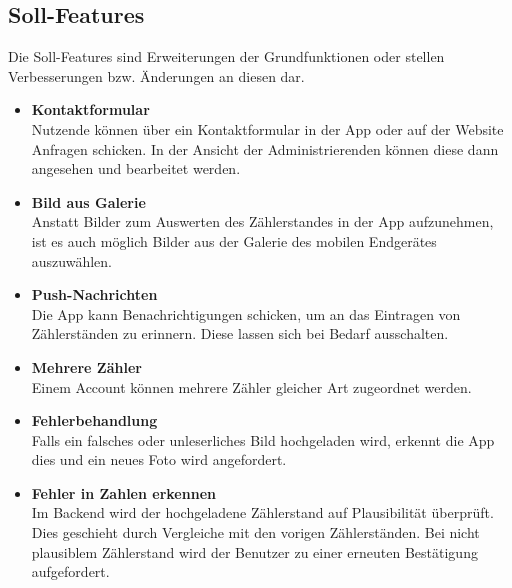 \subsection{Soll-Features}
Die Soll-Features sind Erweiterungen der Grundfunktionen oder stellen Verbesserungen bzw. Änderungen an diesen dar.
\begin{itemize}
\item \textbf{Kontaktformular} \hfill \\
	Nutzende können über ein Kontaktformular in der App oder auf der Website Anfragen schicken.
	In der Ansicht der Administrierenden können diese dann angesehen und bearbeitet werden. 
\item \textbf{Bild aus Galerie} \hfill \\
	Anstatt Bilder zum Auswerten des Zählerstandes in der App aufzunehmen, ist es auch möglich Bilder aus der Galerie des mobilen Endgerätes auszuwählen.
\item \textbf{Push-Nachrichten} \hfill \\
	Die App kann Benachrichtigungen schicken, um an das Eintragen von Zählerständen zu erinnern.
	Diese lassen sich bei Bedarf ausschalten.
\item \textbf{Mehrere Zähler}\hfill \\
	Einem Account können mehrere Zähler gleicher Art zugeordnet werden.
\item \textbf{Fehlerbehandlung} \hfill \\
	Falls ein falsches oder unleserliches Bild hochgeladen wird, erkennt die App dies und ein neues Foto wird angefordert.
\item \textbf{Fehler in Zahlen erkennen} \hfill \\
	Im Backend wird der hochgeladene Zählerstand auf Plausibilität überprüft. Dies geschieht durch Vergleiche mit den vorigen Zählerständen. 
	Bei nicht plausiblem Zählerstand wird der Benutzer zu einer erneuten Bestätigung aufgefordert. 
\end{itemize}

